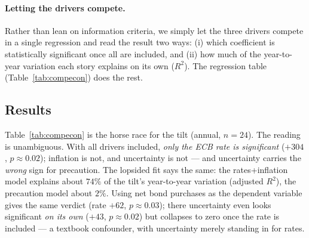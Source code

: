 \documentclass[11pt,a4paper]{article}
\begin{document}
\paragraph{Letting the drivers compete.} Rather than lean on information criteria,
we simply let the three drivers compete in a single regression and read the result
two ways: (i) which coefficient is statistically significant once all are
included, and (ii) how much of the year-to-year variation each story explains on
its own ($R^2$). The regression table (Table~\ref{tab:compecon}) does the rest.

\subsection{Results}
Table~\ref{tab:compecon} is the horse race for the tilt (annual, $n=24$). The
reading is unambiguous. With all drivers included, \emph{only the ECB rate is
significant} ($+304$, $p\approx0.02$); inflation is not, and uncertainty is not
--- and uncertainty carries the \emph{wrong} sign for precaution. The lopsided fit
says the same: the rates+inflation model explains about $74\%$ of the tilt's
year-to-year variation (adjusted $R^2$), the precaution model about $2\%$. Using
net bond purchases as the dependent variable gives the same verdict (rate $+62$,
$p\approx0.03$); there uncertainty even looks significant \emph{on its own}
($+43$, $p\approx0.02$) but collapses to zero once the rate is included --- a
textbook confounder, with uncertainty merely standing in for rates.
\end{document}
